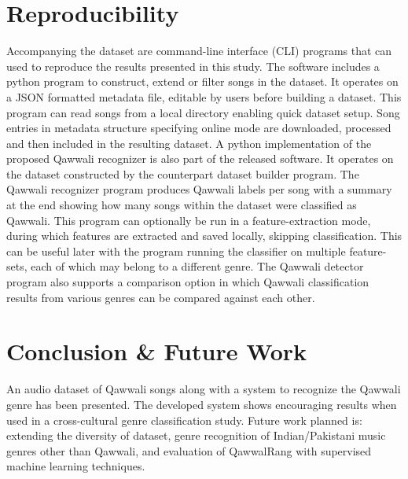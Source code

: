 \documentclass{article}
\begin{document}
\section{Reproducibility}
Accompanying the dataset are command-line interface (CLI) programs that can used to reproduce the results presented in this study. The software \citep{faheem_sheikh} includes a python program to construct, extend or filter songs in the dataset. It operates on a JSON \citep{json} formatted metadata file, editable by users before building a dataset. This program can read songs from a local directory enabling quick dataset setup. Song entries in metadata structure specifying online mode are downloaded, processed and then included in the resulting dataset. A python implementation of the proposed Qawwali recognizer is also part of the released software. It operates on the dataset constructed by the counterpart dataset builder program. The Qawwali recognizer program produces Qawwali labels per song with a summary at the end showing how many songs within the dataset were classified as Qawwali. This program can optionally be run in a feature-extraction mode, during which features are extracted and saved locally, skipping classification. This can be useful later with the program running the classifier on multiple feature-sets,  each of which may belong to a different genre. The Qawwali detector program also supports a comparison option in which Qawwali classification results from various genres can be compared against each other.
\section{Conclusion \& Future Work}
An audio dataset of Qawwali songs along with a system to recognize the Qawwali genre has been presented. The developed system shows encouraging results when used in a cross-cultural genre classification study. Future work planned is: extending the diversity of dataset, genre recognition of Indian/Pakistani music genres other than Qawwali, and evaluation of QawwalRang with supervised machine learning techniques.


\end{document}
